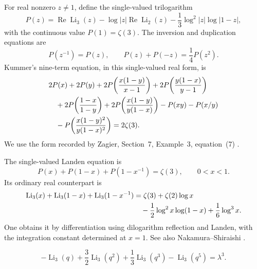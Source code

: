 For real nonzero $z\ne1$, define the single-valued trilogarithm
\[
P(z)=\operatorname{Re}\operatorname{Li}_3(z)
 -\log|z|\operatorname{Re}\operatorname{Li}_2(z)
 -\frac13\log^2|z|\log|1-z|,
\]
with the continuous value $P(1)=\zeta(3)$.
The inversion and duplication equations are
\[
P(z^{-1})=P(z),\qquad P(z)+P(-z)=\frac14P(z^2).
\]
Kummer's nine-term equation, in this single-valued real form, is
\begin{align}
&2P(x)+2P(y)
 +2P\!\left(\frac{x(1-y)}{x-1}\right)
 +2P\!\left(\frac{y(1-x)}{y-1}\right)\notag\\
&\quad+2P\!\left(\frac{1-x}{1-y}\right)
 +2P\!\left(\frac{x(1-y)}{y(1-x)}\right)
 -P(xy)-P(x/y)\notag\\
&\quad-P\!\left(\frac{x(1-y)^2}{y(1-x)^2}\right)
 =2\zeta(3).
\label{eq:plastic-Kummer}
\end{align}
We use the form recorded by Zagier, Section~7, Example~3,
equation~(7) \cite{ZagierPolylogs1991}.

The single-valued Landen equation is
\[
P(x)+P(1-x)+P(1-x^{-1})=\zeta(3),\qquad0<x<1.
\]
Its ordinary real counterpart is
\begin{align}
\operatorname{Li}_3(x)+\operatorname{Li}_3(1-x)
 +\operatorname{Li}_3(1-x^{-1})
 &=\zeta(3)+\zeta(2)\log x\notag\\
 &\quad-\frac12\log^2x\log(1-x)+\frac16\log^3x.
\label{eq:plastic-ordinary-Landen}
\end{align}
One obtains it by differentiation using dilogarithm reflection and
Landen, with the integration constant determined at $x=1$.
See also Nakamura--Shiraishi \cite{NakamuraShiraishi2025}.

\begin{theorem}
\label{thm:plastic-trilog}
\begin{equation}
-\operatorname{Li}_3(q)+\frac32\operatorname{Li}_3(q^2)
 +\frac13\operatorname{Li}_3(q^3)-\operatorname{Li}_3(q^5)
=\lambda^3.
\label{eq:plastic-trilog-proved}
\end{equation}
\end{theorem}

